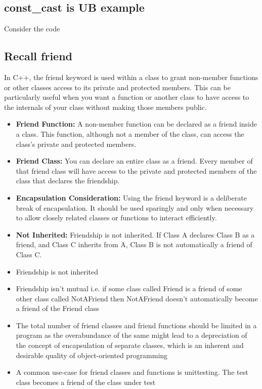 \documentclass{report}
\begin{document}
\bigbreak \noindent 
\subsection{const\_cast is UB example}
\bigbreak \noindent 
Consider the code

\pagebreak 
{}
\bigbreak \noindent 
\subsection{Recall friend}
\bigbreak \noindent 
In C++, the friend keyword is used within a class to grant non-member functions or other classes access to its private and protected members. This can be particularly useful when you want a function or another class to have access to the internals of your class without making those members public.
\begin{itemize}
    \item \textbf{Friend Function:} A non-member function can be declared as a friend inside a class. This function, although not a member of the class, can access the class's private and protected members.
    \item \textbf{Friend Class:} You can declare an entire class as a friend. Every member of that friend class will have access to the private and protected members of the class that declares the friendship.
    \item \textbf{Encapsulation Consideration:} Using the friend keyword is a deliberate break of encapsulation. It should be used sparingly and only when necessary to allow closely related classes or functions to interact efficiently.
    \item \textbf{Not Inherited:} Friendship is not inherited. If Class A declares Class B as a friend, and Class C inherits from A, Class B is not automatically a friend of Class C.
\end{itemize}
\begin{itemize}
    \item Friendship is not inherited
    \item Friendship isn’t mutual i.e. if some class called Friend is a friend of some other class called NotAFriend then NotAFriend doesn’t automatically become a friend of the Friend class
    \item The total number of friend classes and friend functions should be limited in a program as the overabundance of the same might lead to a depreciation of the concept of encapsulation of separate classes, which is an inherent and desirable quality of object-oriented programming
    \item A common use-case for friend classes and functions is unittesting. The test class becomes a friend of the class under test
\end{itemize}
\end{document}
